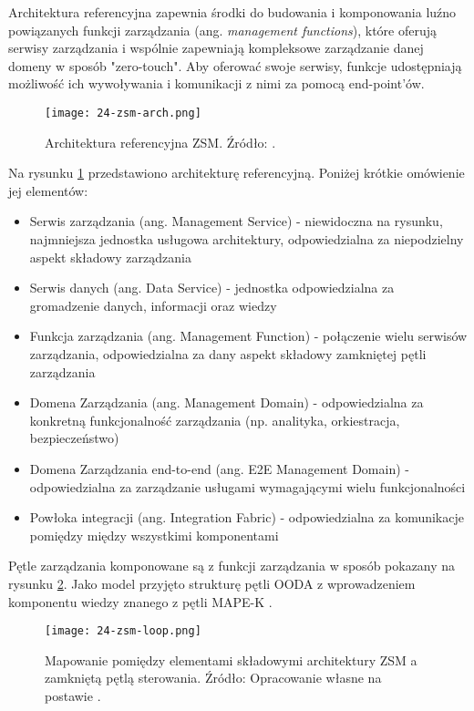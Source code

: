 Architektura referencyjna zapewnia środki do budowania i komponowania luźno powiązanych funkcji zarządzania (ang. \textit{management functions}), które oferują serwisy zarządzania i wspólnie zapewniają kompleksowe zarządzanie danej domeny w sposób "zero-touch". Aby oferować swoje serwisy, funkcje udostępniają możliwość ich wywoływania i komunikacji z nimi za pomocą end-point'ów. 

\begin{figure}[!htbp]
    \centering \texttt{[image: 24-zsm-arch.png]}
    \caption{Architektura referencyjna ZSM. Źródło: \cite{etsizsm2018}.}\label{fig:24-zsm-arch}
\end{figure}

Na rysunku \ref{fig:24-zsm-arch} przedstawiono architekturę referencyjną. Poniżej krótkie omówienie jej elementów:
\begin{itemize}
    \item Serwis zarządzania (ang. Management Service) - niewidoczna na rysunku, najmniejsza jednostka usługowa architektury, odpowiedzialna za niepodzielny aspekt składowy zarządzania
    \item Serwis danych (ang. Data Service) - jednostka odpowiedzialna za gromadzenie danych, informacji oraz wiedzy
    \item Funkcja zarządzania (ang. Management Function) - połączenie wielu serwisów zarządzania, odpowiedzialna za dany aspekt składowy zamkniętej pętli zarządzania
    \item Domena Zarządzania (ang. Management Domain) - odpowiedzialna za konkretną funkcjonalność zarządzania (np. analityka, orkiestracja, bezpieczeństwo)
    \item Domena Zarządzania end-to-end (ang. E2E Management Domain) - odpowiedzialna za zarządzanie usługami wymagającymi wielu funkcjonalności
    \item Powłoka integracji (ang. Integration Fabric) - odpowiedzialna za komunikacje pomiędzy między wszystkimi komponentami
\end{itemize}

Pętle zarządzania komponowane są z funkcji zarządzania w sposób pokazany na rysunku \ref{fig:24-zsm-loop}. Jako model przyjęto  strukturę pętli OODA \cite{boyd1995} z wprowadzeniem komponentu wiedzy znanego z pętli MAPE-K \cite{kephart2003}. 

\begin{figure}[!htbp]
    \centering \texttt{[image: 24-zsm-loop.png]}
    \caption{Mapowanie pomiędzy elementami składowymi architektury ZSM a zamkniętą pętlą sterowania. Źródło: Opracowanie własne na postawie \cite{etsizsm2019}.}\label{fig:24-zsm-loop}
\end{figure}



